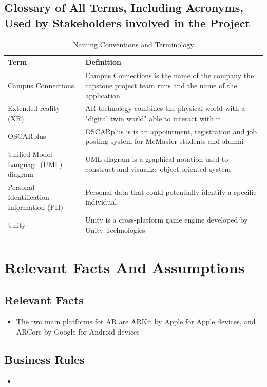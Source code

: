\documentclass[12pt]{article}
\begin{document}
\subsection{Glossary of All Terms, Including Acronyms, Used by Stakeholders
involved in the Project}
\begin{table}[H]
    \centering
    \begin{tabular}{|p{0.3\linewidth} | p{0.7\linewidth}| }
    \hline
    \textbf{Term} & \textbf{Definition}\\
    \hline
    Campus Connections & Campus Connections is the name of the company the capstone project team runs and the name of the application\\
    \hline
    Extended reality (XR) & AR technology combines the physical world with a "digital twin world" able to interact with it\\
    \hline
    OSCARplus & OSCARplus is is an appointment, registration and job posting system for McMaster students and alumni\\
    \hline
    Unified Model Language (UML) diagram & UML diagram is a graphical notation used to construct and visualize object oriented system\\
    \hline
    Personal Identification Information (PII) & Personal data that could potentially identify a specific individual \\
    \hline
    Unity & Unity is a cross-platform game engine developed by Unity Technologies\\
    \hline
    \end{tabular}
    \caption{Naming Conventions and Terminology}
    \label{TblNaming}
\end{table}

\section{Relevant Facts And Assumptions}
\subsection{Relevant Facts}
\begin{itemize}
  \item The two main platforms for AR are ARKit by Apple for Apple devices, and ARCore by Google for Android devices
\end{itemize}

\subsection{Business Rules}
\begin{itemize}
  \item
\end{itemize}
\end{document}
